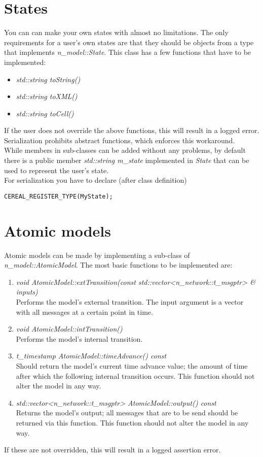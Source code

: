 \section{States}
You can can make your own states with almost no limitations. The only requirements for a user's own states are that they should be objects from a type that implements \textsl{n\_model::State}. This class has a few functions that have to be implemented:
\begin{itemize}
	\item \textsl{std::string toString()}
	\item \textsl{std::string toXML()}
	\item \textsl{std::string toCell()}
\end{itemize}
If the user does not override the above functions, this will result in a logged error. Serialization prohibits abstract functions, which enforces this workaround.\\
While members in sub-classes can be added without any problems, by default there is a public member \textsl{std::string m\_state} implemented in \textsl{State} that can be used to represent the user's state.
\\ For serialization you have to declare (after class definition) 
\begin{verbatim}
CEREAL_REGISTER_TYPE(MyState);
\end{verbatim}

\section{Atomic models}
Atomic models can be made by implementing a sub-class of \\ \textsl{n\_model::AtomicModel}. The most basic functions to be implemented are:
\begin{enumerate}
	\item \textsl{void AtomicModel::extTransition(const std::vector{\textless}n\_network::t\_msgptr{\textgreater} \& inputs)}\\
		Performs the model's external transition. The input argument is a vector with all messages at a certain point in time.
	\item \textsl{void AtomicModel::intTransition()}\\
		Performs the model's internal transition. 
	\item \textsl{t\_timestamp AtomicModel::timeAdvance() const}\\
		Should return the model's current time advance value; the amount of time after which the following internal transition occurs. This function should not alter the model in any way.
	\item \textsl{std::vector{\textless}n\_network::t\_msgptr{\textgreater} AtomicModel::output()  const}\\
		Returns the model's output; all messages that are to be send should be returned via this function. This function should not alter the model in any way.
\end{enumerate}
If these are not overridden, this will result in a logged assertion error.\\

